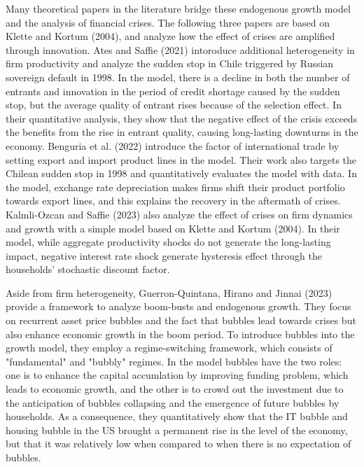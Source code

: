 \documentclass[a4paper,12pt]{article}
\begin{document}
Many theoretical papers in the literature bridge these endogenous growth model and the analysis of financial crises. The following three papers are based on Klette and Kortum (2004), and analyze how the effect of crises are amplified through innovation. Ates and Saffie (2021) intoroduce additional heterogeneity in firm productivity and analyze the sudden stop in Chile triggered by Russian sovereign default in 1998. In the model, there is a decline in both the number of entrants and innovation in the period of credit shortage caused by the sudden stop, but the average quality of entrant rises because of the selection effect. In their quantitative analysis, they show that the negative effect of the crisis exceeds the benefits from the rise in entrant quality, causing long-lasting downturns in the economy. Benguria et al. (2022) introduce the factor of international trade by setting export and import product lines in the model. Their work also targets the Chilean sudden stop in 1998 and quantitatively evaluates the model with data. In the model, exchange rate depreciation makes firms shift their product portfolio towards export lines, and this explains the recovery in the aftermath of crises. Kalmli-Ozcan and Saffie (2023) also analyze the effect of crises on firm dynamics and growth with a simple model based on Klette and Kortum (2004). In their model, while aggregate productivity shocks do not generate the long-lasting impact, negative interest rate shock generate hysteresis effect through the households' stochastic discount factor. \par
Aside from firm heterogeneity, Guerron-Quintana, Hirano and Jinnai (2023) provide a framework to analyze boom-busts and endogenous growth. They focus on recurrent asset price bubbles and the fact that bubbles lead towards crises but also enhance economic growth in the boom period. To introduce bubbles into the growth model, they employ a regime-switching framework, which consists of "fundamental" and "bubbly" regimes. In the model bubbles have the two roles: one is to enhance the capital accumlation by improving funding problem, which leads to economic growth, and the other is to crowd out the investment due to the anticipation of bubbles collapsing and the emergence of future bubbles by households. As a consequence, they quantitatively show that the IT bubble and housing bubble in the US brought a permanent rise in the level of the economy, but that it was relatively low when compared to when there is no expectation of bubbles.\par
\end{document}
